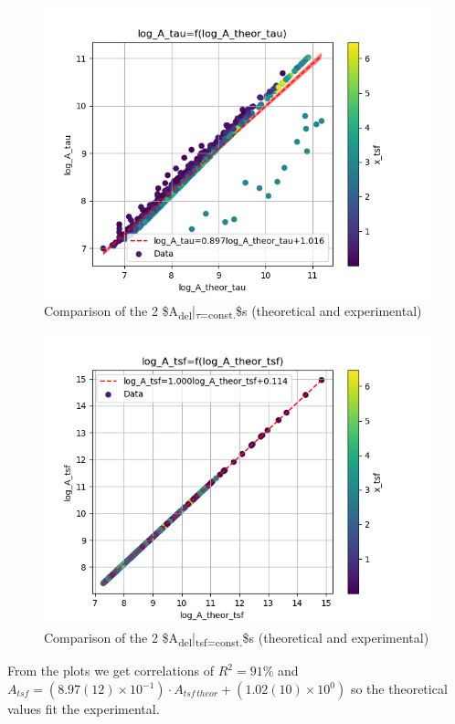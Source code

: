 \documentclass[a4paper,twocolumn]{article}
\begin{document}
\begin{figure}[!htpb]
\centering
\includegraphics[width=.9\linewidth]{./figs/log_A_theor_tau-log_A_tau-color_x_tsf.png}
\caption{\label{fig:A_theor_A_exp_tau}Comparison of the 2 \$A\textsubscript{del}|\textsubscript{\(\tau\)=const.}\$s (theoretical and experimental)}
\end{figure}

\begin{figure}[!htpb]
\centering
\includegraphics[width=.9\linewidth]{./figs/log_A_theor_tsf-log_A_tsf-color_x_tsf.png}
\caption{\label{fig:A_theor_A_exp_tsf}Comparison of the 2 \$A\textsubscript{del}|\textsubscript{tsf=const.}\$s (theoretical and experimental)}
\end{figure}


From the plots we get correlations of \(R^2 = 91\%\)  and \(A_{tsf} = (8.97(12) \times 10^{-1})\cdot A_{tsf\,theor} + (1.02(10) \times 10^{0})\)  so the theoretical values fit the experimental.
\end{document}

